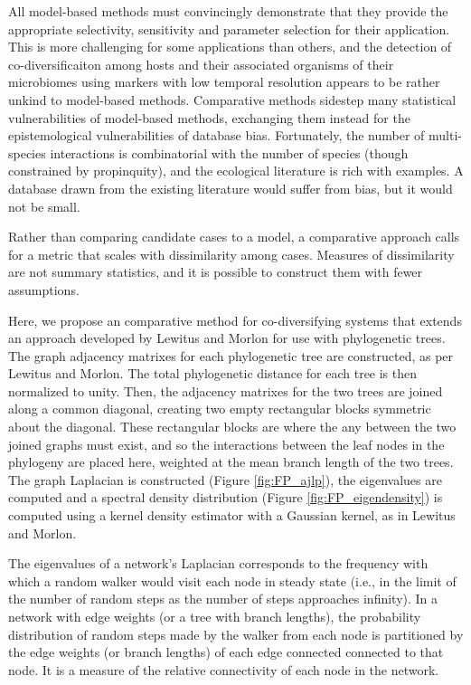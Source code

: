 All model-based methods must convincingly demonstrate that they provide the appropriate selectivity, sensitivity and parameter selection for their application. This is more challenging for some applications than others, and the detection of co-diversificaiton among hosts and their associated organisms of their microbiomes using markers with low temporal resolution appears to be rather unkind to model-based methods. Comparative methods sidestep many statistical vulnerabilities of model-based methods, exchanging them instead for the epistemological vulnerabilities of database bias. Fortunately, the number of multi-species interactions is combinatorial with the number of species (though constrained by propinquity), and the ecological literature is rich with examples. A database drawn from the existing literature would suffer from bias, but it would not be small.

Rather than comparing candidate cases to a model, a comparative approach calls for a metric that scales with dissimilarity among cases. Measures of dissimilarity are not summary statistics, and it is possible to construct them with fewer assumptions. 



Here, we propose an comparative method for co-diversifying systems that extends an approach developed by Lewitus and Morlon \cite{lewitus2015characterizing} for use with phylogenetic trees. The graph adjacency matrixes for each phylogenetic tree are constructed, as per Lewitus and Morlon. The total phylogenetic distance for each tree is then normalized to unity. Then, the adjacency matrixes for the two trees are joined along a common diagonal, creating two empty rectangular blocks symmetric about the diagonal. These rectangular blocks are where the any between the two joined graphs must exist, and so the interactions between the leaf nodes in the phylogeny are placed here, weighted at the mean branch length of the two trees. The graph Laplacian is constructed (Figure \ref{fig:FP_ajlp}), the eigenvalues are computed and a spectral density distribution (Figure \ref{fig:FP_eigendensity}) is computed using a kernel density estimator with a Gaussian kernel, as in Lewitus and Morlon. 



The eigenvalues of a network's Laplacian corresponds to the frequency with which a random walker would visit each node in steady state (i.e., in the limit of the number of random steps as the number of steps approaches infinity). In a network with edge weights (or a tree with branch lengths), the probability distribution of random steps made by the walker from each node is partitioned by the edge weights (or branch lengths) of each edge connected connected to that node. It is a measure of the relative connectivity of each node in the network. 

